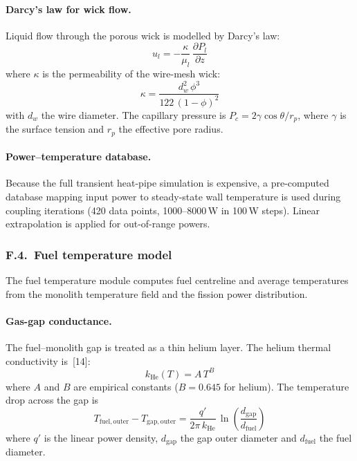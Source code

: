 \documentclass[11pt,a4paper]{article}
\begin{document}
\paragraph{Darcy's law for wick flow.}
Liquid flow through the porous wick is modelled by Darcy's law:
\begin{equation}
u_l = -\frac{\kappa}{\mu_l}\,\frac{\partial P_l}{\partial z}
\end{equation}
where $\kappa$ is the permeability of the wire-mesh wick:
\begin{equation}
\kappa = \frac{d_w^2\,\phi^3}{122\,(1-\phi)^2}
\end{equation}
with $d_w$ the wire diameter. The capillary pressure is
$P_c = 2\gamma\cos\theta / r_p$, where $\gamma$ is the surface tension
and $r_p$ the effective pore radius.

\paragraph{Power--temperature database.}
Because the full transient heat-pipe simulation is expensive, a
pre-computed database mapping input power to steady-state wall
temperature is used during coupling iterations (420 data points, 1000--8000\,W
in 100\,W steps). Linear extrapolation is applied for out-of-range
powers.


\subsubsection*{F.4.~Fuel temperature model}

The fuel temperature module computes fuel centreline and average
temperatures from the monolith temperature field and the fission power
distribution.

\paragraph{Gas-gap conductance.}
The fuel--monolith gap is treated as a thin helium layer. The helium
thermal conductivity is~[14]:
\begin{equation}
k_{\mathrm{He}}(T) = A\,T^{B}
\end{equation}
where $A$ and $B$ are empirical constants ($B = 0.645$ for helium).
The temperature drop across the gap is
\begin{equation}
T_{\mathrm{fuel,outer}} - T_{\mathrm{gap,outer}}
= \frac{q'}{2\pi\,k_{\mathrm{He}}}\,
  \ln\!\left(\frac{d_{\mathrm{gap}}}{d_{\mathrm{fuel}}}\right)
\end{equation}
where $q'$ is the linear power density, $d_{\mathrm{gap}}$ the gap
outer diameter and $d_{\mathrm{fuel}}$ the fuel diameter.
\end{document}

